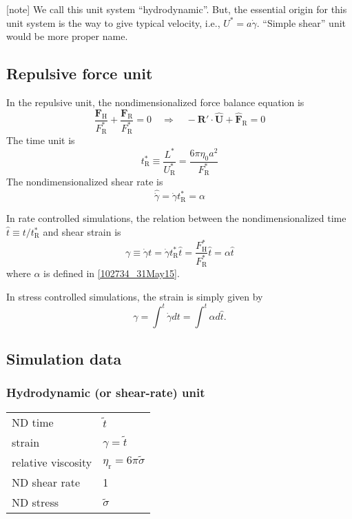 \documentclass[fontsize=11pt]{scrartcl}
\begin{document}
[note]
We call this unit system ``hydrodynamic''.
But, the essential origin for this unit system
is the way to give typical velocity,
i.e., $U^{\ast} = a \dot{\gamma}$.
%
``Simple shear'' unit would be more proper name.


\subsection*{Repulsive force unit}

In the repulsive unit,
the nondimensionalized
force balance equation is
\begin{equation}
 \frac{\bm{F}_{\mathrm{H}}}{F^{\ast}_{\mathrm{R}}}
  +
  \frac{\bm{F}_{\mathrm{R}}}{F^{\ast}_{\mathrm{R}}}  = 0
      \quad
  \Longrightarrow
    \quad
    - \bm{R}' \cdot \hat{\bm{U}} +
    \hat{\bm{F}}_{\mathrm{R}} = 0
\end{equation}
The time unit is
\begin{equation}
 t_{\mathrm{R}}^{\ast}
  \equiv \frac{L^{\ast}}{U_{\mathrm{R}}^{\ast}}
  = \frac{6 \pi \eta_0 a^2}{F_{\mathrm{R}}^{\ast}}
\end{equation}
%
The nondimensionalized shear rate is
\begin{equation}
 \hat{\dot{\gamma}} =
  \dot{\gamma} t_{\mathrm{R}}^{\ast}
  = \alpha 
\end{equation}



In rate controlled simulations,
the relation between
the nondimensionalized time
$\hat{t} \equiv t /t_{\mathrm{R}}^{\ast}$
and shear strain is
\begin{equation}
 \gamma
  \equiv \dot{\gamma} t 
  = \dot{\gamma} t_{\mathrm{R}}^{\ast} \hat{t} 
   = 
\frac{F_{\mathrm{H}}^{\ast}}{F_{\mathrm{R}}^{\ast}}
\hat{t} = \alpha \hat{t}
\end{equation}
where $\alpha$ is defined in \eqref{102734_31May15}.

In stress controlled simulations,
the strain is simply given by
\begin{equation}
 \gamma
 = \int^{t} \dot{\gamma} dt
 = \int^{t} \alpha d\hat{t}.
\end{equation}



\subsection*{Simulation data}


\subsubsection*{Hydrodynamic (or shear-rate) unit}
\begin{center}
\begin{tabular}{ll}
  ND time & $\tilde{t}$  \\
  strain & $\gamma = \tilde{t}$ \\
  relative viscosity &
  $ \eta_{\mathrm{r}}
     = 6 \pi \tilde{\sigma}$ \\
 ND shear rate & 1 \\
ND stress & $\tilde{\sigma} $
\end{tabular} 
\end{center}
\end{document}
